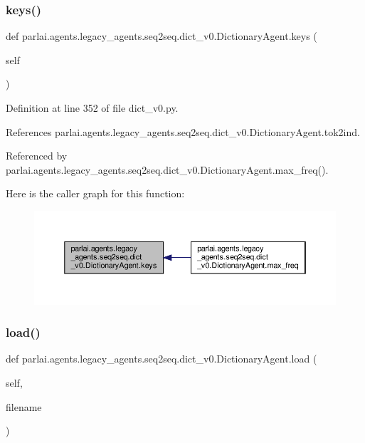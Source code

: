 \subsubsection{\texorpdfstring{keys()}{keys()}}
{\footnotesize\ttfamily def parlai.\+agents.\+legacy\+\_\+agents.\+seq2seq.\+dict\+\_\+v0.\+Dictionary\+Agent.\+keys (\begin{DoxyParamCaption}\item[{}]{self }\end{DoxyParamCaption})}



Definition at line 352 of file dict\+\_\+v0.\+py.



References parlai.\+agents.\+legacy\+\_\+agents.\+seq2seq.\+dict\+\_\+v0.\+Dictionary\+Agent.\+tok2ind.



Referenced by parlai.\+agents.\+legacy\+\_\+agents.\+seq2seq.\+dict\+\_\+v0.\+Dictionary\+Agent.\+max\+\_\+freq().

Here is the caller graph for this function\+:
\nopagebreak
\begin{figure}[H]
\begin{center}
\leavevmode
\includegraphics[width=350pt]{classparlai_1_1agents_1_1legacy__agents_1_1seq2seq_1_1dict__v0_1_1DictionaryAgent_a6f403715cffdfde531b83a9bf6e0f750_icgraph}
\end{center}
\end{figure}
\mbox{\label{classparlai_1_1agents_1_1legacy__agents_1_1seq2seq_1_1dict__v0_1_1DictionaryAgent_a4a13c4937c3cd5bb14d5f28658ece153}} 
\subsubsection{\texorpdfstring{load()}{load()}}
{\footnotesize\ttfamily def parlai.\+agents.\+legacy\+\_\+agents.\+seq2seq.\+dict\+\_\+v0.\+Dictionary\+Agent.\+load (\begin{DoxyParamCaption}\item[{}]{self,  }\item[{}]{filename }\end{DoxyParamCaption})}

